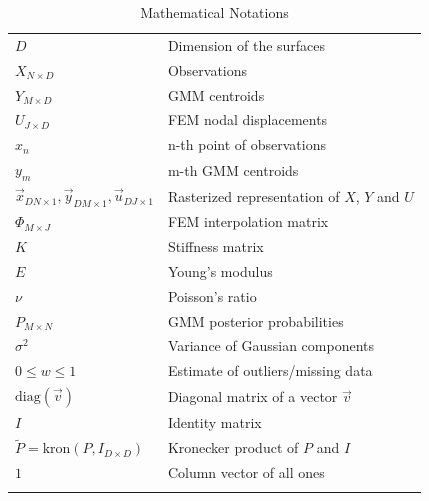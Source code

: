 \documentclass[journal]{IEEEtran}
\newcommand{\diag}{\mathrm{diag}}
\newcommand{\kron}{\mathrm{kron}}
\begin{document}
\begin{table}[!bht]
  \centering
  \caption{Mathematical Notations \label{tbl:notation}}
  \begin{tabular}{lp{}}
  \hline
    $D$ & Dimension of the surfaces\\
    $X_{N\times D}$ & Observations\\
    $Y_{M\times D}$ & GMM centroids\\
    $U_{J\times D}$ & FEM nodal displacements\\
    $x_n$ & n-th point of observations\\
    $y_m$ & m-th GMM centroids\\
    $\vec{x}_{DN \times 1},\vec{y}_{DM \times 1},\vec{u}_{DJ \times 1}$ & Rasterized representation of $X$, $Y$ and $U$\\
    $\Phi_{M\times J}$ & FEM interpolation matrix\\
    $K$ & Stiffness matrix\\
    $E$ & Young's modulus\\
    $\nu$ & Poisson's ratio\\
    $P_{M\times N}$ & GMM posterior probabilities\\ 
    $\sigma^2$ & Variance of Gaussian components\\
    $0{\leq}w{\leq}1$ & Estimate of outliers/missing data\\
    $\diag{(\vec{v})}$ & Diagonal matrix of a vector $\vec{v}$\\
    $I$ & Identity matrix\\
    $\tilde{P} = \kron{(P,I_{D\times{D}})}$ &Kronecker product of $P$ and $I$\\
    $1$ & Column vector of all ones\\
    \hline\\
  \end{tabular}
\end{table}
\end{document}

